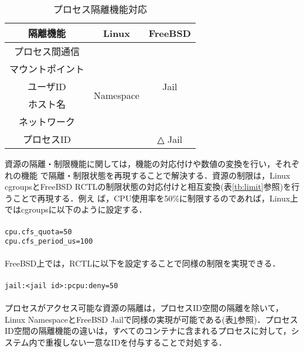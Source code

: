 \documentclass{ipsjpapers}
\begin{document}
\begin{table}[t]
\vspace{-2em}
  \caption{プロセス隔離機能対応}
  \label{tb:isolation}
  \vspace{0.5em}
  \begin{center}
  \begin{tabular}{|c|c|c|} \hline
    隔離機能 & Linux & FreeBSD \\ \hline \hline
    プロセス間通信 & \multirow{6}{*}{Namespace} &  \multirow{5}{*}{Jail} \\ \cline{1-1}
    マウントポイント &  & \\ \cline{1-1}
    ユーザID &  &  \\ \cline{1-1}
    ホスト名 &  & \\ \cline{1-1}
    ネットワーク &  & \\ \cline{1-1} \cline{3-3}
    プロセスID &  & △ Jail \\ \hline
  \end{tabular}
\end{center}
\end{table}
資源の隔離・制限機能に関しては，機能の対応付けや数値の変換を行い，それぞれの機能
で隔離・制限状態を再現することで解決する．資源の制限は，Linux cgroupsとFreeBSD RCTLの制限状態の対応付けと相互変換(表\ref{tb:limit}参照)を行うことで再現する．例え
ば，CPU使用率を50\%に制限するのであれば，Linux上ではcgroupsに以下のように設定する．\\\\
\verb|cpu.cfs_quota=50|\\
\verb|cpu.cfs_period_us=100|\\\\
FreeBSD上では，RCTLに以下を設定することで同様の制限を実現できる．\\\\
\verb|jail:<jail id>:pcpu:deny=50|\\\\
プロセスがアクセス可能な資源の隔離は，プロセスID空間の隔離を除いて，Linux NamespaceとFreeBSD Jailで同様の実現が可能である(表\ref{tb:isolation}参照)．プロセスID空間の隔離機能の違いは，すべてのコンテナに含まれるプロセスに対して，システム内で重複しない一意なIDを付与することで対処する．
\end{document}
